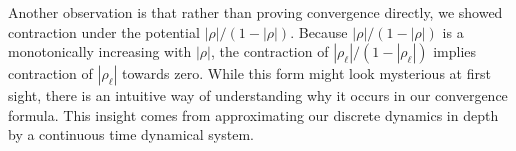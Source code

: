 \documentclass[twoside]{article}
\newcommand{\E}{\mathbb{E}}
\newtheorem{theorem}{Theorem}
\newtheorem{corollary}{Corollary}
\theoremstyle{definition}
\begin{document}
Another observation is that rather than proving convergence directly, we showed contraction under the potential $|\rho|/(1-|\rho|).$ Because $|\rho|/(1-|\rho|)$ is a monotonically increasing with $|\rho|$, the contraction of $|\rho_\ell|/(1-|\rho_\ell|)$ implies contraction of $|\rho_\ell|$ towards zero. 
While this form might look mysterious at first sight, there is an intuitive way of understanding why it occurs in our convergence formula. This insight comes from approximating our discrete dynamics in depth by a continuous time dynamical system. 





\end{document}
